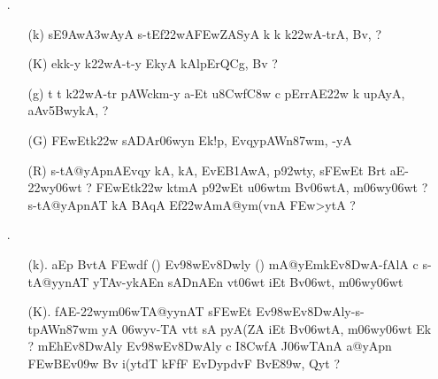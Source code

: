 \def\DevnagVersion{2.15}\documentclass{article}
\begin{document}
\begin{itemize}
\begin{itemize}
            \item[({\dn G})] {\dn BrtFy{\rs -\re}Ef\322w{\rs -\re}\3FEwZASyA\2 s\2-t-y y -TAn t pA\396wAcA(y{\rs -\re}Ef\322w\3FEwnAlFgn\?n g\5Fk{\rs -\re}lAtFn{\rs -\re}Bqyo, -TAn\?n Eky\306wmA/ upmFy\?t {\rs ?\re}} 
                               
            \end{itemize}    

\item[{\dn \dnnum \rn{11}}.] \begin{itemize}

           \item[({\dn k})] {\dn {}s\2E\39Aw\3A3wAyA\2 s\2-tEf\322wA\3FEwZASyA\2 k\? k\? k\322wA-trA, Bv\?, {\rs ?\re}}
           
           \item[({\dn K})] {\dn ek\4k-y k\322wA-t-y\0 EkyA kAlpErQC\?g, Bv\? {\rs ?\re}}
            
           \item[({\dn g})] {\dn t\? t\? k\322wA-tr\? pAWckm-y a-Et u\38Cw\?f\4\3C8w\2 c pErrAE\322w\2 k\? upAyA, aAv\35BwykA, {\rs ?\re}}
           
           \item[({\dn G})] {\dn \3FEwEtk\322w\2 sADAr\306wy\?n Ek!p, EvqypAWn\387wm, -yA} 
           
           \item[({\dn R})] {\dn s\2-tA@yApnAEvqy\? kA, kA, EvEB\31AwA, p\392wty, s\2\3FEwEt Brt\? aE-\322wy\306wt\? {\rs ?\re} \3FEwEtk\322w\2 ktmA\2 p\392wEt u\306wtm\2 Bv\306wtA, m\306wy\306wt\? {\rs ?\re} s\2-tA@yApnAT{\rdt} kA BAqA Ef\322wAmA@ym(v\?nA \3FEw>ytA {\rs ?\re}}
           \end{itemize}

\item[{\dn \dnnum \rn{12}}.]\begin{itemize}
                \item[({\dn k}).] {\dn aEp BvtA\2 \3FEwd\?f\? {\rs (\re}{\dn \dnnum {}}{\rs )\re} Ev\398wEv\38Dwly\? {\rs (\re}{\dn \dnnum {}}{\rs )\re} mA@yEmkEv\38DwA{\rs -\re}fAlA c s\2-tA@yynAT\?{\qvb} yTAv-ykAEn sADnAEn vt\0\306wt\? iEt Bv\306wt, m\306wy\306wt}
                
                \item[({\dn K}).] {\dn fAE-\322wym\306wTA@yynAT{\rdt} s\2\3FEwEt Ev\398wEv\38DwAly{\rs -\re}s\2-tpAWn\387wm\? yA \306wyv-TA vt\0t\?{\rs ,\re} sA pyA\0(ZA iEt Bv\306wtA, m\306wy\306wt\? Ek {\rs ?\re} mEhEv\38DwAly\? Ev\398wEv\38DwAly\? c I\38CwfA\2 J\306wTAnA a@yApn\2 \3FEwBEv\309w Bv\? i(y\?tdT\4 kFfF EvD\?ypdvF BvE\389w, Qy\?t {\rs ?\re}}


\end{itemize}
\end{itemize}
\end{document}
